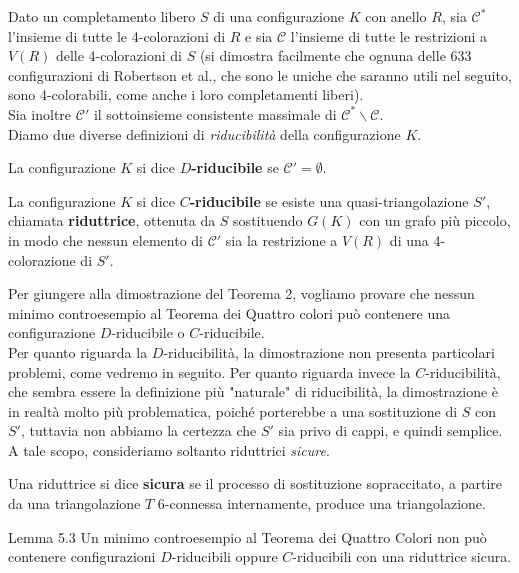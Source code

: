 \documentclass[a4paper,12pt,titlepage]{report}
\begin{document}
    Dato un completamento libero $S$ di una configurazione $K$ con anello $R$, sia $\mathcal{C}^*$ l'insieme di tutte le 4-colorazioni di $R$ e sia $\mathcal{C}$ l'insieme di tutte le restrizioni a $V(R)$ delle 4-colorazioni di $S$ (si dimostra facilmente che ognuna delle 633 configurazioni di Robertson et al., che sono le uniche che saranno utili nel seguito, sono 4-colorabili, come anche i loro completamenti liberi).
    \\Sia inoltre $\mathcal{C}'$ il sottoinsieme consistente massimale di $\mathcal{C}^* \smallsetminus \mathcal{C}$.
    \\Diamo due diverse definizioni di \emph{riducibilità} della configurazione $K$.
    \begin{dfn}
    	La configurazione $K$ si dice {\bfseries $\mathit{D}$-riducibile} se $\mathcal{C}' = \emptyset$.
    \end{dfn}
    \begin{dfn}
    	La configurazione $K$ si dice {\bfseries $\mathit{C}$-riducibile} se esiste una quasi-triangolazione $S'$, chiamata {\bfseries riduttrice}, ottenuta da $S$ sostituendo $G(K)$ con un grafo più piccolo, in modo che nessun elemento di $\mathcal{C}'$ sia la restrizione a $V(R)$ di una 4-colorazione di $S'$.
    \end{dfn}
    Per giungere alla dimostrazione del Teorema 2, vogliamo provare che nessun minimo controesempio al Teorema dei Quattro colori può contenere una configurazione $\mathit{D}$-riducibile o $\mathit{C}$-riducibile.
    \\Per quanto riguarda la $\mathit{D}$-riducibilità, la dimostrazione non presenta particolari problemi, come vedremo in seguito. Per quanto riguarda invece la $\mathit{C}$-riducibilità, che sembra essere la definizione più "naturale" di riducibilità, la dimostrazione è in realtà molto più problematica, poiché porterebbe a una sostituzione di $S$ con $S'$, tuttavia non abbiamo la certezza che $S'$ sia privo di cappi, e quindi semplice.
    \\A tale scopo, consideriamo soltanto riduttrici \emph{sicure}.
    \begin{dfn}
    	Una riduttrice si dice {\bfseries sicura} se il processo di sostituzione sopraccitato, a partire da una triangolazione $T$ 6-connessa internamente, produce una triangolazione.
    \end{dfn}
    \begin{namedthm*}{Lemma 5.3}
    	Un minimo controesempio al Teorema dei Quattro Colori non può contenere configurazioni $\mathit{D}$-riducibili oppure $\mathit{C}$-riducibili con una riduttrice sicura.
    \end{namedthm*}
\end{document}
